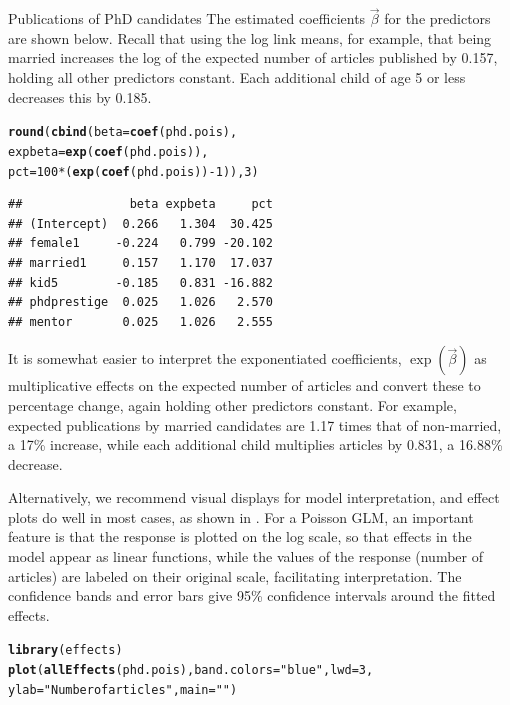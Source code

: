 \documentclass[11pt]{book}\usepackage[]{graphicx}\usepackage[]{color}
\makeatletter
\newcommand{\hlnum}[1]{\textcolor[rgb]{0.686,0.059,0.569}{#1}}%
\newcommand{\hlstr}[1]{\textcolor[rgb]{0.192,0.494,0.8}{#1}}%
\newcommand{\hlopt}[1]{\textcolor[rgb]{0,0,0}{#1}}%
\newcommand{\hlstd}[1]{\textcolor[rgb]{0.345,0.345,0.345}{#1}}%
\newcommand{\hlkwc}[1]{\textcolor[rgb]{0.333,0.667,0.333}{#1}}%
\newcommand{\hlkwd}[1]{\textcolor[rgb]{0.737,0.353,0.396}{\textbf{#1}}}%
\newenvironment{kframe}{%
 \def\at@end@of@kframe{}%
 \ifinner\ifhmode%
  \def\at@end@of@kframe{\end{minipage}}%
  \begin{minipage}{\columnwidth}%
 \fi\fi%
 \def\FrameCommand##1{\hskip\@totalleftmargin \hskip-\fboxsep
 \colorbox{shadecolor}{##1}\hskip-\fboxsep
     \hskip-\linewidth \hskip-\@totalleftmargin \hskip\columnwidth}%
 \MakeFramed {\advance\hsize-\width
   \@totalleftmargin\z@ \linewidth\hsize
   \@setminipage}}%
 {\par\unskip\endMakeFramed%
 \at@end@of@kframe}
\newenvironment{knitrout}{}{} %
\renewenvironment{knitrout}{\small\renewcommand{\baselinestretch}{.85}}{} %
\makeatother
\begin{document}
\begin{Example}[phdpubs1]{Publications of PhD candidates}
The estimated coefficients $\vec{\beta}$ for the predictors are shown below.
Recall that using the log link means, for example, that being married increases
the log of the expected number of
articles published by 0.157, holding all other predictors constant.
Each additional child of age 5 or less decreases this by 0.185.
\begin{knitrout}
\color{fgcolor}\begin{kframe}
\begin{alltt}
\hlkwd{round}\hlstd{(}\hlkwd{cbind}\hlstd{(}\hlkwc{beta}\hlstd{=}\hlkwd{coef}\hlstd{(phd.pois),}
            \hlkwc{expbeta}\hlstd{=}\hlkwd{exp}\hlstd{(}\hlkwd{coef}\hlstd{(phd.pois)),}
            \hlkwc{pct}\hlstd{=}\hlnum{100}\hlopt{*}\hlstd{(}\hlkwd{exp}\hlstd{(}\hlkwd{coef}\hlstd{(phd.pois))}\hlopt{-}\hlnum{1}\hlstd{)),}\hlnum{3}\hlstd{)}
\end{alltt}
\begin{verbatim}
##               beta expbeta     pct
## (Intercept)  0.266   1.304  30.425
## female1     -0.224   0.799 -20.102
## married1     0.157   1.170  17.037
## kid5        -0.185   0.831 -16.882
## phdprestige  0.025   1.026   2.570
## mentor       0.025   1.026   2.555
\end{verbatim}
\end{kframe}
\end{knitrout}
\noindent It is somewhat easier to interpret the exponentiated coefficients, $\exp(\vec{\beta})$
as multiplicative effects on the expected number of articles and convert these to percentage
change, again holding other predictors constant.
For example, expected publications by married candidates are 1.17 times that of non-married,
a 17\% increase, while each additional child multiplies articles by 0.831, a 16.88\% decrease.

Alternatively, we recommend visual displays for model interpretation, and effect plots do well
in most cases, as shown in  .
For a Poisson GLM, an important feature is that the response is plotted on
the log scale, so that effects in the model appear as linear functions, while the
values of the response (number of articles) are labeled on their original scale, facilitating
interpretation. The confidence bands and error bars give 95\% confidence intervals
around the fitted effects.

\begin{knitrout}
\color{fgcolor}\begin{kframe}
\begin{alltt}
\hlkwd{library}\hlstd{(effects)}
\hlkwd{plot}\hlstd{(}\hlkwd{allEffects}\hlstd{(phd.pois),} \hlkwc{band.colors}\hlstd{=}\hlstr{"blue"}\hlstd{,} \hlkwc{lwd}\hlstd{=}\hlnum{3}\hlstd{,}
     \hlkwc{ylab}\hlstd{=}\hlstr{"Number of articles"}\hlstd{,} \hlkwc{main}\hlstd{=}\hlstr{""}\hlstd{)}
\end{alltt}
\end{kframe}\begin{figure}[!htbp]



\end{figure}
\end{knitrout}
\end{Example}
\end{document}
